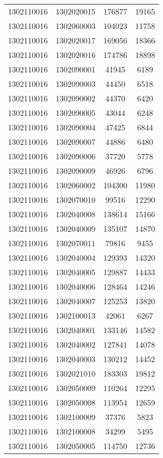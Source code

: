\begin{longtable}[h]{llcc}
		1302110016 & 1302020015 & 176877 & 19165\\
		1302110016 & 1302060003 & 104023 & 11758\\
		1302110016 & 1302020017 & 169056 & 18366\\
		1302110016 & 1302020016 & 174786 & 18898\\
		1302110016 & 1302090001 & 41945 & 6189\\
		1302110016 & 1302090003 & 44450 & 6518\\
		1302110016 & 1302090002 & 44370 & 6420\\
		1302110016 & 1302090005 & 43044 & 6248\\
		1302110016 & 1302090004 & 47425 & 6844\\
		1302110016 & 1302090007 & 44886 & 6480\\
		1302110016 & 1302090006 & 37720 & 5778\\
		1302110016 & 1302090009 & 46926 & 6796\\
		1302110016 & 1302060002 & 104300 & 11980\\
		1302110016 & 1302070010 & 99516 & 12290\\
		1302110016 & 1302040008 & 138614 & 15166\\
		1302110016 & 1302040009 & 135107 & 14870\\
		1302110016 & 1302070011 & 79816 & 9455\\
		1302110016 & 1302040004 & 129393 & 14320\\
		1302110016 & 1302040005 & 129887 & 14433\\
		1302110016 & 1302040006 & 128464 & 14246\\
		1302110016 & 1302040007 & 125253 & 13820\\
		1302110016 & 1302100013 & 42061 & 6267\\
		1302110016 & 1302040001 & 133146 & 14582\\
		1302110016 & 1302040002 & 127841 & 14078\\
		1302110016 & 1302040003 & 130212 & 14452\\
		1302110016 & 1302021010 & 183303 & 19812\\
		1302110016 & 1302050009 & 110264 & 12295\\
		1302110016 & 1302050008 & 113954 & 12659\\
		1302110016 & 1302100009 & 37376 & 5823\\
		1302110016 & 1302100008 & 34299 & 5495\\
		1302110016 & 1302050005 & 114750 & 12736\\

\end{longtable}
